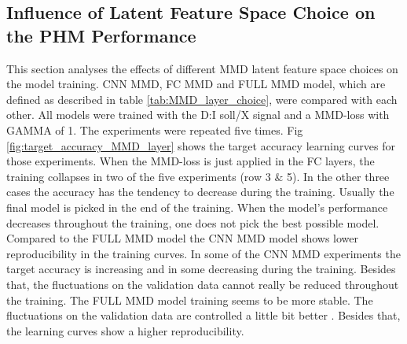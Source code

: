 \subsection{Influence of Latent Feature Space Choice on the PHM Performance}\label{ch:Influence_Layer_real_dataset}
This section analyses the effects of different MMD latent feature space choices on the model training. CNN MMD, FC MMD and FULL MMD model, which are defined as described in table \ref{tab:MMD_layer_choice}, were compared with each other. All models were trained with the D:I soll/X signal and a MMD-loss with GAMMA of 1. The experiments were repeated five times. Fig \ref{fig:target_accuracy_MMD_layer} shows the target accuracy learning curves for those experiments. When the MMD-loss is just applied in the FC layers, the training collapses in two of the five experiments (row 3 $\&$ 5). In the other three cases the accuracy has the tendency to decrease during the training. Usually the final model is picked in the end of the training. When the model's performance decreases throughout the training, one does not pick the best possible model. Compared to the FULL MMD model the CNN MMD model shows lower reproducibility in the training curves. In some of the CNN MMD experiments the target accuracy is increasing and in some decreasing during the training. Besides that, the fluctuations on the validation data cannot really be reduced throughout the training. The FULL MMD model training seems to be more stable. The fluctuations on the validation data are controlled a little bit better . Besides that, the learning curves show a higher reproducibility.  



